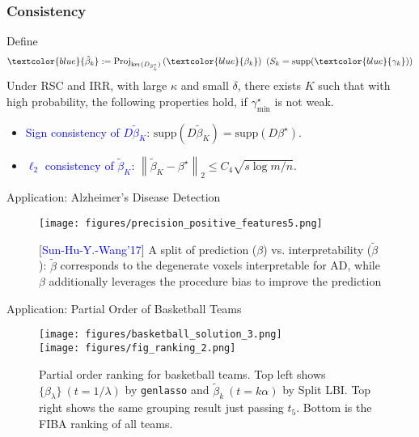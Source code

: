 \documentclass[slidestop,compress,9pt,epsfig,color]{beamer}
\theoremstyle{example}
\begin{document}
\begin{frame}
    \frametitle{Consistency}
    \begin{theorem}
        \label{thm:slbi-rev-cstc}
        Define
        \begin{equation}
            \textcolor{blue}{\tilde{\beta}_k} := \mathrm{Proj}_{\ker(D_{S_k^c})} \left( \textcolor{blue}{\beta_k} \right)\ \left( S_k = \mathrm{supp}(\textcolor{blue}{\gamma_k}) \right)
        \end{equation}
        Under RSC and IRR, with large $\kappa$ and small $\delta$, there exists $K$ such that with high probability, the following properties hold, if $\gamma_{\min}^{\star}$ is not weak.
        \begin{itemize}
            \item
                \textcolor{blue}{Sign consistency of $D \tilde{\beta}_K$}: $\mathrm{supp}(D \tilde{\beta}_K) = \mathrm{supp}(D \beta^{\star})$.
            \item
                \textcolor{blue}{$\ell_2$ consistency of $\tilde{\beta}_K$}: $\left\| \tilde{\beta}_K - \beta^{\star} \right\|_2 \le C_4 \sqrt{s\log m / n}$.
        \end{itemize}
    \end{theorem}
\end{frame}

\begin{frame}{Application: Alzheimer's Disease Detection}
\begin{figure}
    \centering
	\texttt{[image: figures/precision\_positive\_features5.png]}    
	\caption{[\textcolor{blue}{Sun-Hu-Y.-Wang'17}] A split of prediction ($\beta$) vs. interpretability ($\tilde{\beta}$): $\tilde{\beta}$ corresponds to the degenerate voxels interpretable for AD, while $\beta$ additionally leverages the procedure bias to improve the prediction}
    \label{fig:AD}
\end{figure}
\end{frame}

\begin{frame}{Application: Partial Order of Basketball Teams}
\begin{figure}
    \centering
    \texttt{[image: figures/basketball\_solution\_3.png]}\\
    \texttt{[image: figures/fig\_ranking\_2.png]}
    \caption{Partial order ranking for basketball teams. Top left shows $\{\beta_\lambda\}\ (t = 1/\lambda)$ by \texttt{genlasso} and $\tilde{\beta}_k\ (t = k\alpha)$ by Split LBI. Top right shows the same grouping result just passing $t_5$. Bottom is the FIBA ranking of all teams.}
    \label{fig:real-basketball-group}
\end{figure}
\end{frame}
\end{document}

